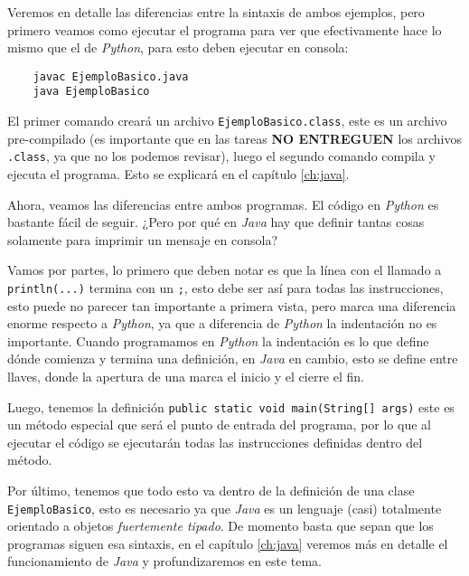   Veremos en detalle las diferencias entre la sintaxis de ambos ejemplos, pero primero
  veamos como ejecutar el programa para ver que efectivamente hace lo mismo que el de 
  \textit{Python}, para esto deben ejecutar en consola:

  \begin{verbatim}
    javac EjemploBasico.java
    java EjemploBasico
  \end{verbatim}

  El primer comando creará un archivo \texttt{EjemploBasico.class}, este es un archivo
  pre-compilado (es importante que en las tareas \textbf{NO ENTREGUEN} los archivos 
  \texttt{.class}, ya que no los podemos revisar), luego el segundo comando compila y 
  ejecuta el programa.
  Esto se explicará en el capítulo \ref{ch:java}.

  Ahora, veamos las diferencias entre ambos programas.
  El código en \textit{Python} es bastante fácil de seguir.
  ¿Pero por qué en \textit{Java} hay que definir tantas cosas solamente para imprimir un
  mensaje en consola?

  Vamos por partes, lo primero que deben notar es que la línea con el llamado a 
  \texttt{println(...)} termina con un \texttt{;}, esto debe ser así para todas las 
  instrucciones, esto puede no parecer tan importante a primera vista, pero marca una
  diferencia enorme respecto a \textit{Python}, ya que a diferencia de \textit{Python} 
  la indentación no es importante.
  Cuando programamos en \textit{Python} la indentación es lo que define dónde comienza
  y termina una definición, en \textit{Java} en cambio, esto se define entre llaves, 
  donde la apertura de una marca el inicio y el cierre el fin.

  Luego, tenemos la definición \texttt{public static void main(String[] args)}
  este es un método especial que será el punto de entrada del programa, por lo que al 
  ejecutar el código se ejecutarán todas las instrucciones definidas dentro del método.
  
  Por último, tenemos que todo esto va dentro de la definición de una clase 
  \texttt{EjemploBasico}, esto es necesario ya que \textit{Java} es un lenguaje 
  (casi) totalmente orientado a objetos \textit{fuertemente tipado}.
  De momento basta que sepan que los programas siguen esa sintaxis, en el capítulo 
  \ref{ch:java} veremos más en detalle el funcionamiento de \textit{Java} y 
  profundizaremos en este tema.
%
